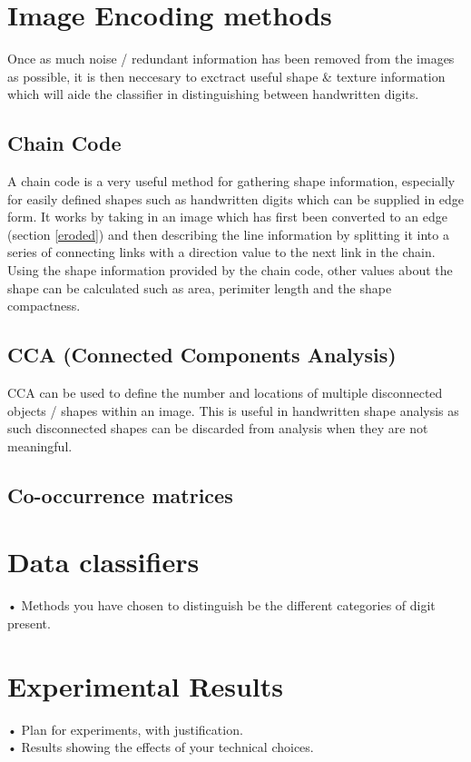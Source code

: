 \documentclass[12pt]{article}
\begin{document}
\section{Image Encoding methods} \label{encoding}
  Once as much noise / redundant information has been removed from the images as possible, it is then neccesary to exctract useful shape \& texture information which will aide the classifier in distinguishing between handwritten digits.

  \subsection{Chain Code} \label{chain-code}
   A chain code \citep{freeman1961encoding} is a very useful method for gathering shape information, especially for easily defined shapes such as handwritten digits which can be supplied in edge form. It works by taking in an image which has first been converted to an edge (section \ref{eroded}) and then describing the line information by splitting it into a series of connecting links with a direction value to the next link in the chain. Using the shape information provided by the chain code, other values about the shape can be calculated such as area, perimiter length and the shape compactness.

  \subsection{CCA (Connected Components Analysis)}
    CCA can be used to define the number and locations of multiple disconnected objects / shapes within an image. This is useful in handwritten shape analysis as such disconnected shapes can be discarded from analysis when they are not meaningful.

  \subsection{Co-occurrence matrices}


\section{Data classifiers}
• Methods you have chosen to distinguish be the different categories of digit present.

\section{Experimental Results}
• Plan for experiments, with justification.\\
• Results showing the effects of your technical choices.
\end{document}
